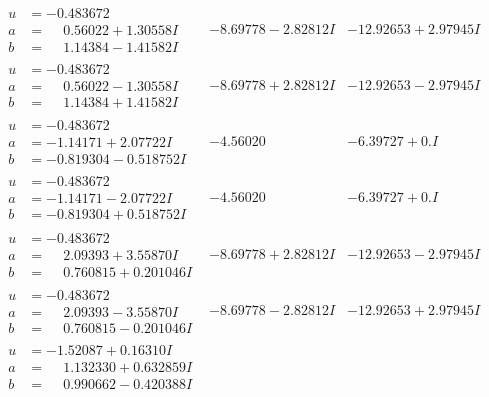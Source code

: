 \documentclass[1p]{elsarticle_modified}
\theoremstyle{definition}
\begin{document}
$$\begin{array}{c|c|c}
\begin{aligned}
u &= -0.483672\phantom{ +0.000000I} \\
a &= \phantom{-}0.56022 + 1.30558 I \\
b &= \phantom{-}1.14384 - 1.41582 I\end{aligned}
 & -8.69778 - 2.82812 I & -12.92653 + 2.97945 I \\ \hline\begin{aligned}
u &= -0.483672\phantom{ +0.000000I} \\
a &= \phantom{-}0.56022 - 1.30558 I \\
b &= \phantom{-}1.14384 + 1.41582 I\end{aligned}
 & -8.69778 + 2.82812 I & -12.92653 - 2.97945 I \\ \hline\begin{aligned}
u &= -0.483672\phantom{ +0.000000I} \\
a &= -1.14171 + 2.07722 I \\
b &= -0.819304 - 0.518752 I\end{aligned}
 & -4.56020\phantom{ +0.000000I} & -6.39727 + 0. I\phantom{ +0.000000I} \\ \hline\begin{aligned}
u &= -0.483672\phantom{ +0.000000I} \\
a &= -1.14171 - 2.07722 I \\
b &= -0.819304 + 0.518752 I\end{aligned}
 & -4.56020\phantom{ +0.000000I} & -6.39727 + 0. I\phantom{ +0.000000I} \\ \hline\begin{aligned}
u &= -0.483672\phantom{ +0.000000I} \\
a &= \phantom{-}2.09393 + 3.55870 I \\
b &= \phantom{-}0.760815 + 0.201046 I\end{aligned}
 & -8.69778 + 2.82812 I & -12.92653 - 2.97945 I \\ \hline\begin{aligned}
u &= -0.483672\phantom{ +0.000000I} \\
a &= \phantom{-}2.09393 - 3.55870 I \\
b &= \phantom{-}0.760815 - 0.201046 I\end{aligned}
 & -8.69778 - 2.82812 I & -12.92653 + 2.97945 I \\ \hline\begin{aligned}
u &= -1.52087 + 0.16310 I \\
a &= \phantom{-}1.132330 + 0.632859 I \\
b &= \phantom{-}0.990662 - 0.420388 I\end{aligned}

\end{array}$$
\end{document}
